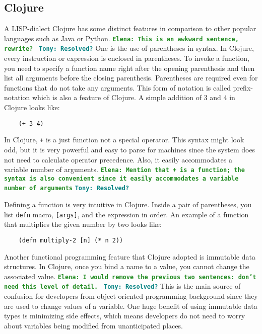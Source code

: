 \documentclass[12pt]{article}
\newcommand{\comment}[1]{{\bf \tt  {#1}}}
\newcommand{\emcomment}[1]{\textcolor{ForestGreen}{\comment{Elena: {#1}}}}
\newcommand{\tscomment}[1]{\textcolor{Teal}{\comment{Tony: {#1}}}}
\begin{document}
	\subsection{Clojure}
	A LISP-dialect Clojure has some distinct features in comparison to other popular languages such as Java or Python.
	\emcomment{This is an awkward sentence, rewrite? } \tscomment{Resolved?}
	One is the use of parentheses in syntax. In Clojure, every instruction or expression is enclosed in parentheses. To invoke a 
	function, you need to specify a function name right after the opening parenthesis and then list all arguments before the 
	closing parenthesis. Parentheses are required even for functions that do not take any arguments. This form of notation is 
	called prefix-notation which is also a feature of Clojure. A simple addition of 3 and 4 in Clojure looks like: 
	\begin{verbatim}
	(+ 3 4)
	\end{verbatim}
	In Clojure, \texttt{+} is a just function not a special operator. This syntax might look odd, but it is very powerful and easy to parse for machines since the system does not need to 
	calculate operator precedence. Also, it easily accommodates a variable number of arguments. \emcomment{Mention that + is a function; the syntax is also convenient since it easily accommodates a variable number of arguments} \tscomment{Resolved?}
	
	Defining a function is very intuitive in Clojure. Inside a pair of parentheses, you list \texttt{defn} macro, \texttt{[args]}, 
	and the expression in order. An example of a function that multiplies the given number by two looks like:
	 \begin{verbatim}
	(defn multiply-2 [n] (* n 2))
	\end{verbatim}

	Another functional programming feature that Clojure adopted is immutable data structures. In Clojure, once you bind a 
	name to a value, you cannot change the associated value.  
	\emcomment{I would remove the previous two sentences: don't need this level of detail. }
	\tscomment{Resolved?}
	This is the main source of confusion for developers from object oriented programming background since they are used to 
	change values of a variable. One huge benefit of using immutable data types is minimizing side effects, which means 
	developers do not need to worry about variables being modified from unanticipated places.
\end{document}
